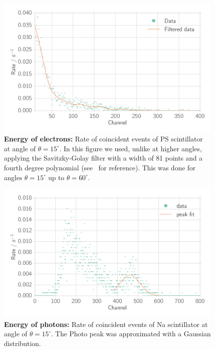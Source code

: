 \begin{figure}[htpb]
    \centering
    \includegraphics[width=0.9\linewidth]{./analysis/figures/coin_ps_15_filter_}
    \caption{\textbf{Energy of electrons:}
        Rate of coincident events of 
        PS scintillator at angle of $\theta = 15^\circ$.
        In this figure we used, unlike at higher angles, applying the Savitzky-Golay filter
        with a width of 81 points and a fourth
    degree polynomial (see~\cite{scipy} for reference). This was done for 
angles $\theta = 15^\circ$ up to $\theta = 60^\circ$.}
\label{fig:coin_ps_15}
\end{figure}

\begin{figure}[htpb]
    \centering
    \includegraphics[width=0.9\linewidth]{./analysis/figures/coin_na_30}
    \caption{\textbf{Energy of photons:} Rate of coincident events of 
        Na scintillator at angle of $\theta = 15^\circ$. The Photo peak was approximated
    with a Gaussian distribution.}
\label{fig:coin_na_30}
\end{figure}




